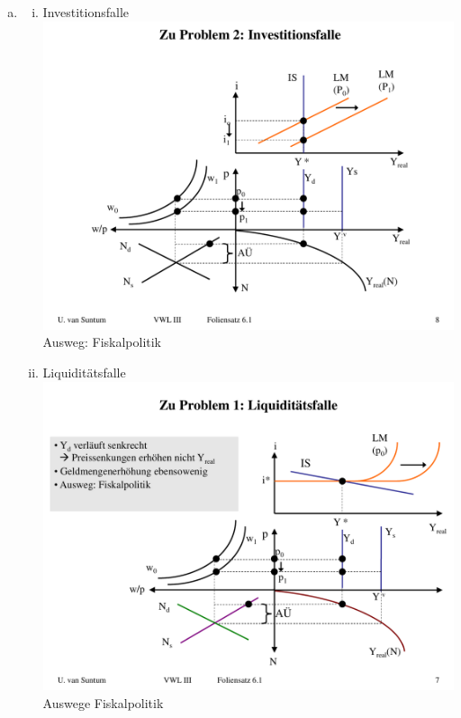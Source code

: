 \documentclass{scrartcl}
\begin{document}
\begin{enumerate}[(a)]
\item
\begin{enumerate}[(i)]
  \item Investitionsfalle\\ \includegraphics[width=\textwidth]{Bilder/Neoklassische_Synthese_Invest.pdf}\\
      Ausweg: Fiskalpolitik
  \item Liquidit\"{a}tsfalle \\ \includegraphics[width=\textwidth]{Bilder/Neoklassische_Synthese_Liquid.pdf}\\
Auswege Fiskalpolitik


\end{enumerate}
\end{enumerate}
\end{document}
